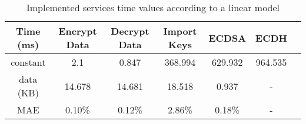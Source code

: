 \begin{table}[h!]
\centering
\def\arraystretch{1.5}
\begin{tabular}{|c|c|c|c|c|c|c|}
\hline
	Time (ms) & Encrypt Data  & Decrypt Data  & Import Keys & ECDSA & ECDH   \\ \hline
	constant  & 2.1    & 0.847  & 368.994  & 629.932 & 964.535 \\ \hline
	data (KB) & 14.678 & 14.681 & 18.518 & 0.937 & - \\ \hline
	MAE	  & 0.10\% & 0.12\%  & 2.86\% & 0.18\% & - \\ \hline
\end{tabular}
\caption{Implemented services time values according to a linear model}
\label{tab:services-model}
\end{table}

